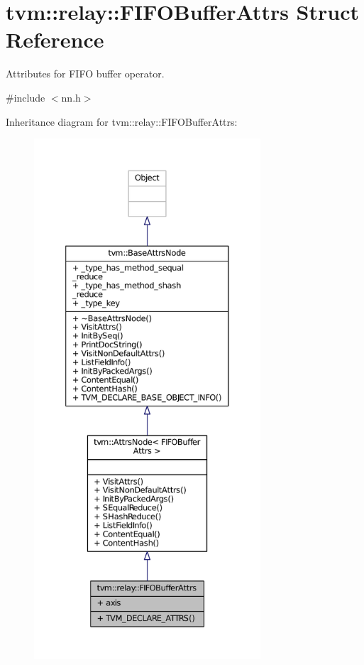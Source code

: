 \hypertarget{structtvm_1_1relay_1_1FIFOBufferAttrs}{}\section{tvm\+:\+:relay\+:\+:F\+I\+F\+O\+Buffer\+Attrs Struct Reference}
\label{structtvm_1_1relay_1_1FIFOBufferAttrs}


Attributes for F\+I\+FO buffer operator.  




{\ttfamily \#include $<$nn.\+h$>$}



Inheritance diagram for tvm\+:\+:relay\+:\+:F\+I\+F\+O\+Buffer\+Attrs\+:
\nopagebreak
\begin{figure}[H]
\begin{center}
\leavevmode
\includegraphics[height=550pt]{structtvm_1_1relay_1_1FIFOBufferAttrs__inherit__graph}
\end{center}
\end{figure}


